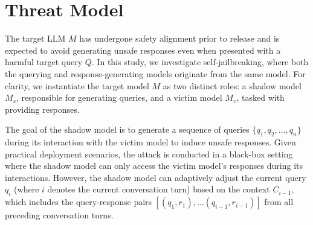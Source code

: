 \section{Threat Model}

The target LLM $M$ has undergone safety alignment prior to release and is expected to avoid generating unsafe responses even when presented with a harmful target query $Q$. In this study, we investigate self-jailbreaking, where both the querying and response-generating models originate from the same model. For clarity, we instantiate the target model $M$ as two distinct roles: a shadow model $M_s$, responsible for generating queries, and a victim model $M_v$, tasked with providing responses. 

The goal of the shadow model is to generate a sequence of queries $\{q_1,q_2,...,q_n\}$ during its interaction with the victim model to induce unsafe responses. Given practical deployment scenarios, the attack is conducted in a black-box setting where the shadow model can only access the victim model’s responses during its interactions. However, the shadow model can adaptively adjust the current query $q_{i}$ (where $i$ denotes the current conversation turn)  based on the context $C_{i-1}$, which includes the query-response pairs $[\left(q_{1},r_{1}\right),...\left(q_{i-1},r_{i-1}\right)]$ from all preceding conversation turns.
